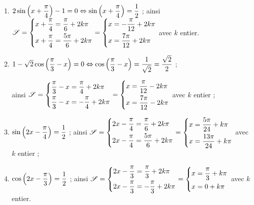 \documentclass[a4paper,11pt]{article}
\begin{document}
\medskip


\begin{enumerate}
	\item $2\sin \left(x+\dfrac{\pi}{4}\right)-1 = 0 \Leftrightarrow \sin \left(x+\dfrac{\pi}{4}\right)=\dfrac12$  ; ainsi $\mathscr{S}=\begin{dcases} x+\dfrac{\pi}{4} = \dfrac{\pi}{6}+2k\pi \\ x+\dfrac{\pi}{4} = \dfrac{5\pi}{6}+2k\pi \end{dcases} = \begin{dcases} x = -\dfrac{\pi}{12}+2k\pi \\ x = \dfrac{7\pi}{12}+2k\pi \end{dcases}$ avec $k$ entier.
	\item $1-\sqrt{2} \cos \left(\dfrac{\pi}{3} - x \right) = 0 \Leftrightarrow \cos \left(\dfrac{\pi}{3} - x \right)=\dfrac{1}{\sqrt{2}}=\dfrac{\sqrt{2}}{2}$ ;
	
	\hspace{1cm}ainsi $\mathscr{S}=\begin{dcases} \dfrac{\pi}{3} - x = \dfrac{\pi}{4}+2k\pi \\ \dfrac{\pi}{3} - x = -\dfrac{\pi}{4}+2k\pi \end{dcases} = \begin{dcases} x = \dfrac{\pi}{12}-2k\pi \\ x = \dfrac{7\pi}{12}-2k\pi \end{dcases}$ avec $k$ entier ;
	\item $\sin \left(2x - \dfrac{\pi}{4} \right) = \dfrac12$ ; ainsi $\mathscr{S}=\begin{dcases} 2x - \dfrac{\pi}{4} = \dfrac{\pi}{6}+2k\pi \\ 2x - \dfrac{\pi}{4} = \dfrac{5\pi}{6}+2k\pi \end{dcases} = \begin{dcases} x = \dfrac{5\pi}{24}+k\pi \\ x = \dfrac{13\pi}{24}+k\pi \end{dcases}$ avec $k$ entier ;
	\item $\cos \left(2x -\dfrac{\pi}{3} \right) = \dfrac12$ ; ainsi $\mathscr{S}=\begin{dcases} 2x -\dfrac{\pi}{3} = \dfrac{\pi}{3}+2k\pi \\ 2x -\dfrac{\pi}{3} = -\dfrac{\pi}{3}+2k\pi \end{dcases} = \begin{dcases} x = \dfrac{\pi}{3}+k\pi \\ x = 0+k\pi \end{dcases}$ avec $k$ entier.
\end{enumerate}
\end{document}
